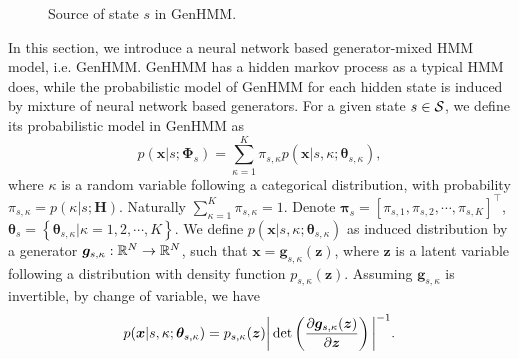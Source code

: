 \documentclass[letterpaper]{article} %
\begin{document}
\begin{figure}[!t]
  \centering
  \caption{Source of state $s$ in GenHMM.}
  \label{fig:gen-mix}
  \vspace{0.3cm}
\end{figure}

In this section, we introduce a neural network based generator-mixed HMM model, i.e. GenHMM. GenHMM has a hidden markov process as a typical HMM does, while the probabilistic model of GenHMM for each hidden state is induced by mixture of neural network based generators. For a given state $s\in \mathcal{S}$, we define its probabilistic model in GenHMM as
\begin{equation}
  p(\bm{x}| s; \bm{\Phi}_{s}) = \sum_{\kappa=1}^{K}\pi_{s, \kappa} p(\bm{x}| s, \kappa; \bm{\theta}_{s, \kappa}),
\end{equation}
where $\kappa$ is a random variable following a categorical distribution, with probability $\pi_{s, \kappa} = p(\kappa | s; \bm{H})$. Naturally $\sum_{\kappa = 1}^{K} \pi_{s, \kappa}= 1$. Denote $\bm{\pi}_{s} = [\pi_{s,1}, \pi_{s,2}, \cdots, \pi_{s,K}]^{\intercal}$,
$\bm{\theta}_s = \left\{ \bm{\theta}_{s, \kappa}| \kappa = 1, 2, \cdots, K \right\}$. 
We define $p(\bm{x}| s, \kappa; \bm{\theta}_{s, \kappa})$ as induced distribution by a generator $\bm{g}_{s,\kappa}: \mathbb{R}^{N}\rightarrow\mathbb{R}^{N}$, such that $\bm{x}=\bm{g}_{s, \kappa}(\bm{z})$, where $\bm{z}$ is a latent variable following a distribution with density function $p_{s,\kappa}(\bm{z})$. Assuming $\bm{g}_{s, \kappa}$ is invertible, by change of variable, we have
\begin{equation}\label{eq:changel-variable}
  p(\bm{x}| s, \kappa; \bm{\theta}_{s, \kappa}) = p_{s,\kappa}(\bm{z})\bigg| \det\left( \frac{ \partial \bm{g}_{s,\kappa}(\bm{z})}{\partial \bm{z}} \right)\bigg|^{-1}.
\end{equation}
\end{document}
